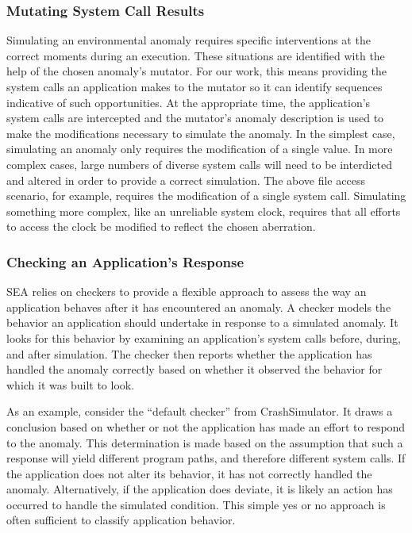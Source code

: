 \subsubsection{Mutating System Call Results}
\label{SUBSUB:MutatingCommunications}
Simulating an environmental anomaly requires specific interventions at the
correct moments during an execution.
These situations are identified
with the help of the chosen anomaly's
mutator.
For our work,
this means providing the system calls
an application makes to the
mutator
so it can identify sequences
indicative of such opportunities.
At the appropriate time,
the application's system calls
are intercepted
and the mutator's anomaly description is used to
make the modifications necessary
to simulate the anomaly.
In the simplest case,
simulating an anomaly only requires
the modification of a single value.
In more complex cases,
large numbers of diverse system calls
will need to be interdicted and altered
in order to provide a correct simulation.
The above file access scenario, for example,
requires the modification of a single system call.
Simulating something more complex,
like an unreliable system clock,
requires that all efforts
to access the clock
be modified to reflect the chosen aberration.

\subsubsection{Checking an Application's Response}
\label{SUBSUB:CheckingResponse}
SEA relies on checkers
to provide a flexible approach to assess the way an application
behaves after it has encountered an anomaly.
A checker models
the behavior an application should undertake
in response to a simulated anomaly.
It looks for this behavior by examining an application's system calls
before, during, and after simulation.
The checker then reports whether the application has handled
the anomaly correctly
based on whether it observed the behavior for which it was built to look.

As an example, consider the ``default checker'' from CrashSimulator.
It draws a conclusion based on
whether or not the application
has made an effort to respond
to the anomaly.
This determination is made based
on the assumption
that such a response will yield
different program paths, and therefore different system calls.
If the application
does not alter its behavior, it has not
correctly handled the anomaly.
Alternatively,
if the application does deviate,
it is likely
an action has occurred to handle the simulated condition.
This simple yes or no approach
is often sufficient
to classify application behavior.

